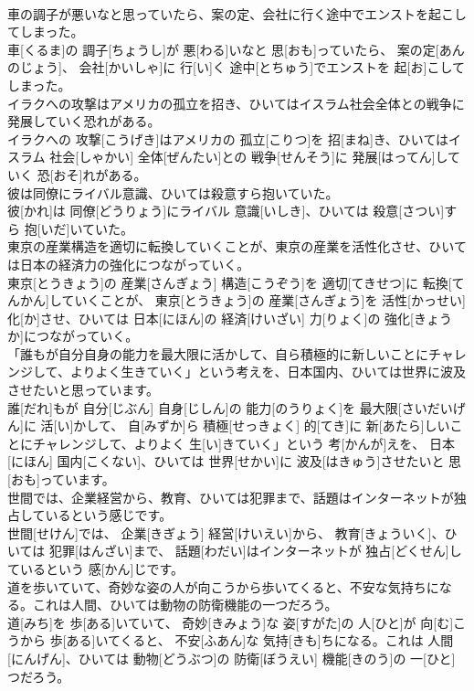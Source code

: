 \documentclass[8pt]{extreport}
\begin{document}
\begin{CJK}{UTF8}{min}
\\	車の調子が悪いなと思っていたら、案の定、会社に行く途中でエンストを起こしてしまった。	
\\	車[くるま]の 調子[ちょうし]が 悪[わる]いなと 思[おも]っていたら、 案の定[あんのじょう]、 会社[かいしゃ]に 行[い]く 途中[とちゅう]でエンストを 起[お]こしてしまった。
\\	イラクへの攻撃はアメリカの孤立を招き、ひいてはイスラム社会全体との戦争に発展していく恐れがある。	
\\	イラクへの 攻撃[こうげき]はアメリカの 孤立[こりつ]を 招[まね]き、ひいてはイスラム 社会[しゃかい] 全体[ぜんたい]との 戦争[せんそう]に 発展[はってん]していく 恐[おそ]れがある。
\\	彼は同僚にライバル意識、ひいては殺意すら抱いていた。	
\\	彼[かれ]は 同僚[どうりょう]にライバル 意識[いしき]、ひいては 殺意[さつい]すら 抱[いだ]いていた。
\\	東京の産業構造を適切に転換していくことが、東京の産業を活性化させ、ひいては日本の経済力の強化につながっていく。	
\\	東京[とうきょう]の 産業[さんぎょう] 構造[こうぞう]を 適切[てきせつ]に 転換[てんかん]していくことが、 東京[とうきょう]の 産業[さんぎょう]を 活性[かっせい] 化[か]させ、ひいては 日本[にほん]の 経済[けいざい] 力[りょく]の 強化[きょうか]につながっていく。
\\	「誰もが自分自身の能力を最大限に活かして、自ら積極的に新しいことにチャレンジして、よりよく生きていく」という考えを、日本国内、ひいては世界に波及させたいと思っています。	
\\	誰[だれ]もが 自分[じぶん] 自身[じしん]の 能力[のうりょく]を 最大限[さいだいげん]に 活[い]かして、 自[みずか]ら 積極[せっきょく] 的[てき]に 新[あたら]しいことにチャレンジして、よりよく 生[い]きていく」という 考[かんが]えを、 日本[にほん] 国内[こくない]、ひいては 世界[せかい]に 波及[はきゅう]させたいと 思[おも]っています。
\\	世間では、企業経営から、教育、ひいては犯罪まで、話題はインターネットが独占しているという感じです。	
\\	世間[せけん]では、 企業[きぎょう] 経営[けいえい]から、 教育[きょういく]、ひいては 犯罪[はんざい]まで、 話題[わだい]はインターネットが 独占[どくせん]しているという 感[かん]じです。
\\	道を歩いていて、奇妙な姿の人が向こうから歩いてくると、不安な気持ちになる。これは人間、ひいては動物の防衛機能の一つだろう。	
\\	道[みち]を 歩[ある]いていて、 奇妙[きみょう]な 姿[すがた]の 人[ひと]が 向[む]こうから 歩[ある]いてくると、 不安[ふあん]な 気持[きも]ちになる。これは 人間[にんげん]、ひいては 動物[どうぶつ]の 防衛[ぼうえい] 機能[きのう]の 一[ひと]つだろう。

\end{CJK}
\end{document}
